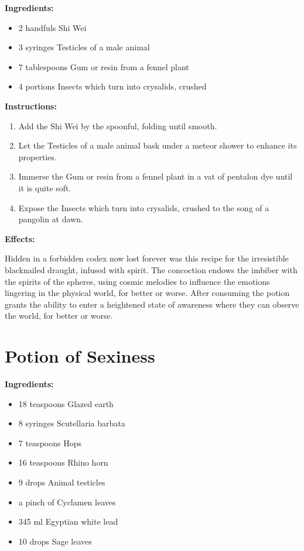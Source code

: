 \documentclass{article}
\begin{document}
\textbf{Ingredients:}

\begin{itemize}
  \item 2 handfuls Shi Wei
  \item 3 syringes Testicles of a male animal
  \item 7 tablespoons Gum or resin from a fennel plant
  \item 4 portions Insects which turn into crysalids, crushed
\end{itemize}

\textbf{Instructions:}

\begin{enumerate}
  \item Add the Shi Wei by the spoonful, folding until smooth.
  \item Let the Testicles of a male animal bask under a meteor shower to enhance its properties.
  \item Immerse the Gum or resin from a fennel plant in a vat of pentalon dye until it is quite soft.
  \item Expose the Insects which turn into crysalids, crushed to the song of a pangolin at dawn.
\end{enumerate}

\textbf{Effects:}

Hidden in a forbidden codex now lost forever was this recipe for the irresistible blacknailed draught, infused with spirit. The concoction endows the imbiber with the spirits of the spheres, using cosmic melodies to influence the emotions lingering in the physical world, for better or worse. After consuming the potion grants the ability to enter a heightened state of awareness where they can observe the world, for better or worse.

\newpage
\section*{Potion of Sexiness}

\textbf{Ingredients:}

\begin{itemize}
  \item 18 teaspoons Glazed earth
  \item 8 syringes Scutellaria barbata
  \item 7 teaspoons Hops
  \item 16 teaspoons Rhino horn
  \item 9 drops Animal testicles
  \item a pinch of Cyclamen leaves
  \item 345 ml Egyptian white lead
  \item 10 drops Sage leaves
\end{itemize}
\end{document}
